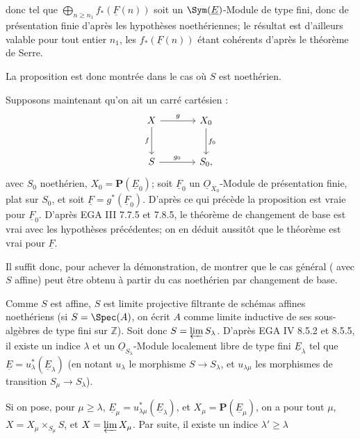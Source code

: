 
donc tel que \(\bigoplus_{n\geq n_1} f_*(\underline{F}(n))\) soit un \(\Sym(\underline{E})\)-Module de type fini, donc de présentation finie d'après les hypothèses noethériennes; le résultat est d'ailleurs valable pour tout entier \(n_1\), les \(f_*(\underline{F}(n))\) étant cohérents d'après le théorème de Serre.

La proposition est donc montrée dans le cas où \(S\) est noethérien.

Supposons maintenant qu'on ait un carré cartésien :
\[
\begin{tikzcd}[column sep=large,row sep=large]
X \arrow[r,"g"] \arrow[d,"f"'] & X_0 \arrow[d,"f_0"]\\
S \arrow[r,"g_0"] & S_0,
\end{tikzcd}
\]
avec \(S_0\) noethérien, \(X_0=\mathbf P(\underline{E}_0)\); soit \(\underline{F}_0\) un \(\underline{O}_{X_0}\)-Module de présentation finie, plat sur \(S_0\), et soit \(\underline{F}=g^*(\underline{F}_0)\). D'après ce qui précède la proposition est vraie pour \(\underline{F}_0\). D'après EGA III 7.7.5 et 7.8.5, le théorème de changement de base est vrai avec les hypothèses précédentes; on en déduit aussitôt que le théorème est vrai pour \(\underline{F}\).

Il suffit donc, pour achever la démonstration, de montrer que le cas général ( avec \(S\) affine) peut être obtenu à partir du cas noethérien par changement de base.

Comme \(S\) est affine, \(S\) est limite projective filtrante de schémas affines noethériens (si \(S=\Spec(A)\), on écrit \(A\) comme limite inductive de ses sous-algèbres de type fini sur \(\mathbb Z\)). Soit donc \(S=\varprojlim S_\lambda\). D'après EGA IV 8.5.2 et 8.5.5, il existe un indice \(\lambda\) et un \(\underline{O}_{S_\lambda}\)-Module localement libre de type fini \(\underline{E}_\lambda\) tel que \(\underline{E}=u_\lambda^*(\underline{E}_\lambda)\) (en notant \(u_\lambda\) le morphisme \(S\to S_\lambda\), et \(u_{\lambda\mu}\) les morphismes de transition \(S_\mu\to S_\lambda\)).

Si on pose, pour \(\mu\geq\lambda\), \(\underline{E}_\mu=u_{\lambda\mu}^*(\underline{E}_\lambda)\), et \(X_\mu=\mathbf P(\underline{E}_\mu)\), on a pour tout \(\mu\), \(X=X_\mu\times_{S_\mu}S\), et \(X=\varprojlim X_\mu\). Par suite, il existe un indice \(\lambda'\geq\lambda\)
